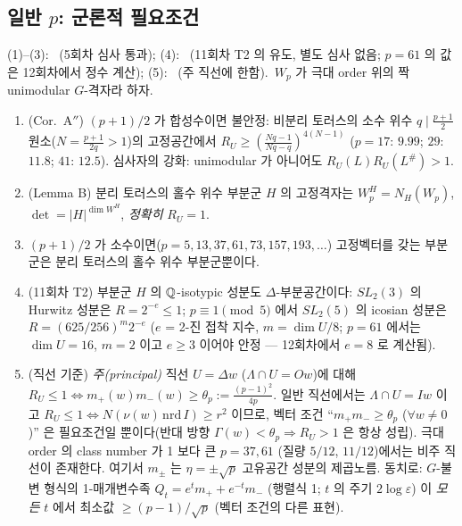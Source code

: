 \subsection{일반 $p$: 군론적 필요조건}
\begin{proposition}\label{prop:sl2pnec}(1)--(3): \tagP\ (5회차 심사 통과); (4): \tagP\ (11회차 T2 의 유도, 별도 심사 없음; $p=61$ 의 값은 12회차에서 정수 계산); (5): \tagP\ (주 직선에 한함).\ $W_p$ 가 극대 order 위의 짝 unimodular $G$-격자라 하자.
\begin{enumerate}
\item (Cor.\ A$''$) $(p+1)/2$ 가 합성수이면 불안정: 비분리 토러스의 소수 위수 $q\mid\tfrac{p+1}2$ 원소($N=\tfrac{p+1}{2q}>1$)의 고정공간에서 $R_U\ge(\tfrac{Nq-1}{Nq-q})^{4(N-1)}$ ($p=17$: $9.99$; $29$: $11.8$; $41$: $12.5$). 심사자의 강화: unimodular 가 아니어도 $R_U(L)R_U(L^\#)>1$.
\item (Lemma B) 분리 토러스의 홀수 위수 부분군 $H$ 의 고정격자는 $W_p^H=N_H(W_p)$, $\det=|H|^{\dim W^H}$, \emph{정확히} $R_U=1$.
\item $(p+1)/2$ 가 소수이면($p=5,13,37,61,73,157,193,\dots$) 고정벡터를 갖는 부분군은 분리 토러스의 홀수 위수 부분군뿐이다.
\item (11회차 T2) 부분군 $H$ 의 $\mathbb{Q}$-isotypic 성분도 $\Delta$-부분공간이다: $SL_2(3)$ 의 Hurwitz 성분은 $R=2^{-e}\le1$; $p\equiv1\pmod5$ 에서 $SL_2(5)$ 의 icosian 성분은 $R=(625/256)^{m}2^{-e}$ ($e$ = 2-진 접착 지수, $m=\dim U/8$; $p=61$ 에서는 $\dim U=16$, $m=2$ 이고 $e\ge3$ 이어야 안정 --- 12회차에서 $e=8$ 로 계산됨).
\item (직선 기준) \emph{주(principal)} 직선 $U=\Delta w$ ($\Lambda\cap U=Ow$)에 대해 $R_U\le1\iff m_+(w)m_-(w)\ge\theta_p:=\tfrac{(p-1)^2}{4p}$. 일반 직선에서는 $\Lambda\cap U=Iw$ 이고 $R_U\le1\iff N(\nu(w)\,\mathrm{nrd}\,I)\ge r^2$ 이므로, 벡터 조건 ``$m_+m_-\ge\theta_p$ ($\forall w\ne0$)'' 은 필요조건일 뿐이다(반대 방향 $\Gamma(w)<\theta_p\Rightarrow R_U>1$ 은 항상 성립). 극대 order 의 class number 가 1 보다 큰 $p=37,61$ (질량 $5/12$, $11/12$)에서는 비주 직선이 존재한다. 여기서 $m_\pm$ 는 $\eta=\pm\sqrt p$ 고유공간 성분의 제곱노름. 동치로: $G$-불변 형식의 1-매개변수족 $Q_t=e^tm_++e^{-t}m_-$ (행렬식 1; $t$ 의 주기 $2\log\varepsilon$) 이 \emph{모든} $t$ 에서 최소값 $\ge(p-1)/\sqrt p$ (벡터 조건의 다른 표현).
\end{enumerate}
\end{proposition}

